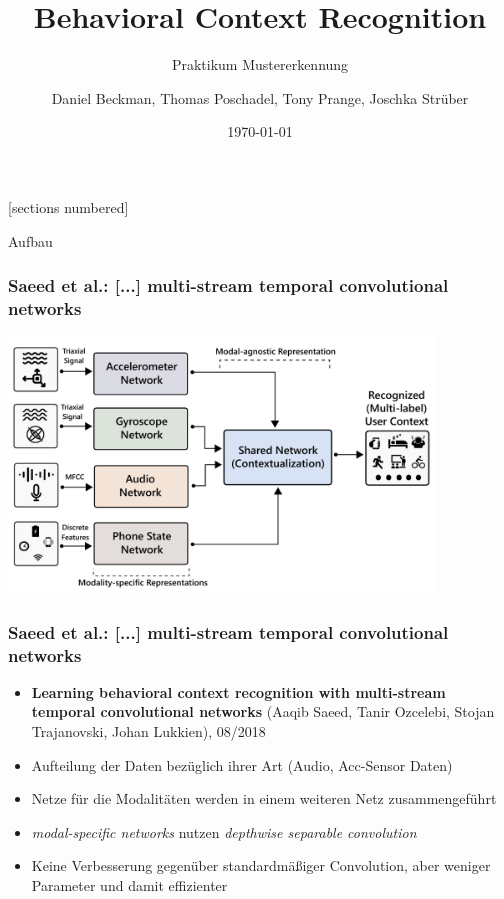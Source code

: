 \documentclass[10pt,%
	wide,%
	xcolor={x11names},%
	hyperref={colorlinks},%
	pantone312,%
	handout,%
	]{beamer}
\author{Daniel Beckman, Thomas Poschadel, Tony Prange, Joschka Strüber}
\title{Behavioral Context Recognition}
\subtitle{Praktikum Mustererkennung}
\date{\today}
\begin{document}
[sections numbered]

\begin{frame}[plain]
  \maketitle
\end{frame}

\begin{frame}[t]{Aufbau}
\end{frame}

\begin{frame}
	\frametitle{Saeed et al.: [...] multi-stream temporal convolutional networks}
	\begin{center}
		\includegraphics[width=0.85\textwidth]{img/multi-modal-network.png}
	\end{center}
\end{frame}

\begin{frame}
	\frametitle{Saeed et al.: [...] multi-stream temporal convolutional networks}
	\begin{itemize}
		\item \textbf{Learning behavioral context recognition with multi-stream temporal convolutional networks} (Aaqib Saeed, Tanir Ozcelebi, Stojan Trajanovski, Johan Lukkien), 08/2018 \cite{saeed2018learning}
		\item Aufteilung der Daten bezüglich ihrer Art (Audio, Acc-Sensor Daten)
		\item Netze für die Modalitäten werden in einem weiteren Netz zusammengeführt
		\item \emph{modal-specific networks} nutzen \emph{depthwise separable convolution}
		\item Keine Verbesserung gegenüber standardmäßiger Convolution, aber weniger Parameter und damit effizienter
	\end{itemize}
\end{frame}
\end{document}
